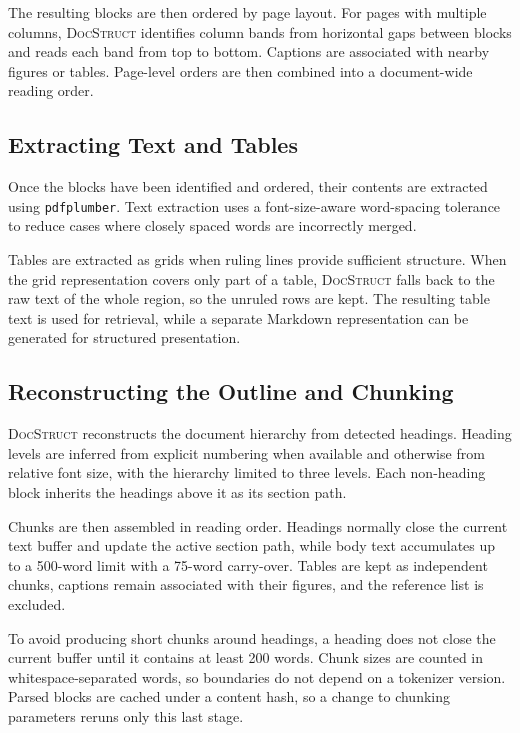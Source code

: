 \documentclass[11pt]{article}
\newcommand{\ds}{\textsc{DocStruct}}
\begin{document}
The resulting blocks are then ordered by page layout. For pages with multiple columns, \ds{} identifies column bands from horizontal gaps between blocks and reads each band from top to bottom. Captions are associated with nearby figures or tables. Page-level orders are then combined into a document-wide reading order.

\subsection{Extracting Text and Tables}
\label{sec:extract}

Once the blocks have been identified and ordered, their contents are extracted using \texttt{pdfplumber}. Text extraction uses a font-size-aware word-spacing tolerance to reduce cases where closely spaced words are incorrectly merged.

Tables are extracted as grids when ruling lines provide sufficient structure. When the grid representation covers only part of a table, \ds{} falls back to the raw text of the whole region, so the unruled rows are kept. The resulting table text is used for retrieval, while a separate Markdown representation can be generated for structured presentation.

\subsection{Reconstructing the Outline and Chunking}
\label{sec:chunking}

\ds{} reconstructs the document hierarchy from detected headings. Heading levels are inferred from explicit numbering when available and otherwise from relative font size, with the hierarchy limited to three levels. Each non-heading block inherits the headings above it as its section path.

Chunks are then assembled in reading order. Headings normally close the current text buffer and update the active section path, while body text accumulates up to a 500-word limit with a 75-word carry-over. Tables are kept as independent chunks, captions remain associated with their figures, and the reference list is excluded.

To avoid producing short chunks around headings, a heading does not close the current buffer until it contains at least 200 words. Chunk sizes are counted in whitespace-separated words, so boundaries do not depend on a tokenizer version. Parsed blocks are cached under a content hash, so a change to chunking parameters reruns only this last stage.
\end{document}

